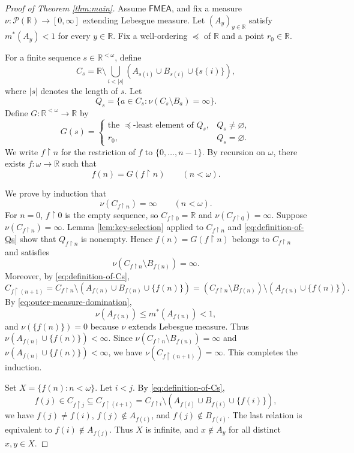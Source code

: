 \documentclass{amsart}
\theoremstyle{plain}
\theoremstyle{definition}
\newcommand{\R}{\mathbb{R}}
\newcommand{\Pc}{\mathcal{P}}
\newcommand{\FMEA}{\mathsf{FMEA}}
\begin{document}
\begin{proof}[Proof of Theorem \ref{thm:main}]
Assume $\FMEA$, and fix a measure $\nu:\Pc(\R)\to[0,\infty]$ extending Lebesgue measure.
Let $(A_y)_{y\in\R}$ satisfy $m^*(A_y)<1$ for every $y\in\R$.
Fix a well-ordering $\preceq$ of $\R$ and a point $r_0\in\R$.

For a finite sequence $s\in\R^{<\omega}$, define
\begin{equation}\label{eq:definition-of-Cs}
C_s
=
\R\setminus\bigcup_{i<|s|}\left(A_{s(i)}\cup B_{s(i)}\cup\{s(i)\}\right),
\end{equation}
where $|s|$ denotes the length of $s$.
Let
\begin{equation}\label{eq:definition-of-Qs}
Q_s
=
\{a\in C_s:\nu(C_s\setminus B_a)=\infty\}.
\end{equation}
Define $G:\R^{<\omega}\to\R$ by
\[
G(s)=
\begin{cases}
\text{the $\preceq$-least element of $Q_s$}, & Q_s\ne\varnothing,\\
r_0, & Q_s=\varnothing.
\end{cases}
\]
We write $f\upharpoonright n$ for the restriction of $f$ to $\{0,\ldots,n-1\}$.
By recursion on $\omega$, there exists $f:\omega\to\R$ such that
\[
f(n)=G(f\upharpoonright n)
\qquad(n<\omega).
\]

We prove by induction that
\[
\nu(C_{f\upharpoonright n})=\infty
\qquad(n<\omega).
\]
For $n=0$, $f\upharpoonright 0$ is the empty sequence, so $C_{f\upharpoonright 0}=\R$ and $\nu(C_{f\upharpoonright 0})=\infty$.
Suppose $\nu(C_{f\upharpoonright n})=\infty$.
Lemma \ref{lem:key-selection} applied to $C_{f\upharpoonright n}$ and \eqref{eq:definition-of-Qs} show that $Q_{f\upharpoonright n}$ is nonempty.
Hence $f(n)=G(f\upharpoonright n)$ belongs to $C_{f\upharpoonright n}$ and satisfies
\[
\nu(C_{f\upharpoonright n}\setminus B_{f(n)})=\infty.
\]
Moreover, by \eqref{eq:definition-of-Cs},
\[
C_{f\upharpoonright(n+1)}
=
C_{f\upharpoonright n}\setminus\left(A_{f(n)}\cup B_{f(n)}\cup\{f(n)\}\right)
=
(C_{f\upharpoonright n}\setminus B_{f(n)})\setminus\left(A_{f(n)}\cup\{f(n)\}\right).
\]
By \eqref{eq:outer-measure-domination},
\[
\nu(A_{f(n)})\le m^*(A_{f(n)})<1,
\]
and $\nu(\{f(n)\})=0$ because $\nu$ extends Lebesgue measure.
Thus $\nu(A_{f(n)}\cup\{f(n)\})<\infty$.
Since $\nu(C_{f\upharpoonright n}\setminus B_{f(n)})=\infty$ and $\nu(A_{f(n)}\cup\{f(n)\})<\infty$, we have $\nu(C_{f\upharpoonright(n+1)})=\infty$.
This completes the induction.

Set $X=\{f(n):n<\omega\}$.
Let $i<j$.
By \eqref{eq:definition-of-Cs},
\[
f(j)\in C_{f\upharpoonright j}\subseteq C_{f\upharpoonright(i+1)}
=C_{f\upharpoonright i}\setminus\left(A_{f(i)}\cup B_{f(i)}\cup\{f(i)\}\right),
\]
we have $f(j)\ne f(i)$, $f(j)\notin A_{f(i)}$, and $f(j)\notin B_{f(i)}$.
The last relation is equivalent to $f(i)\notin A_{f(j)}$.
Thus $X$ is infinite, and $x\notin A_y$ for all distinct $x,y\in X$.
\end{proof}
\end{document}
